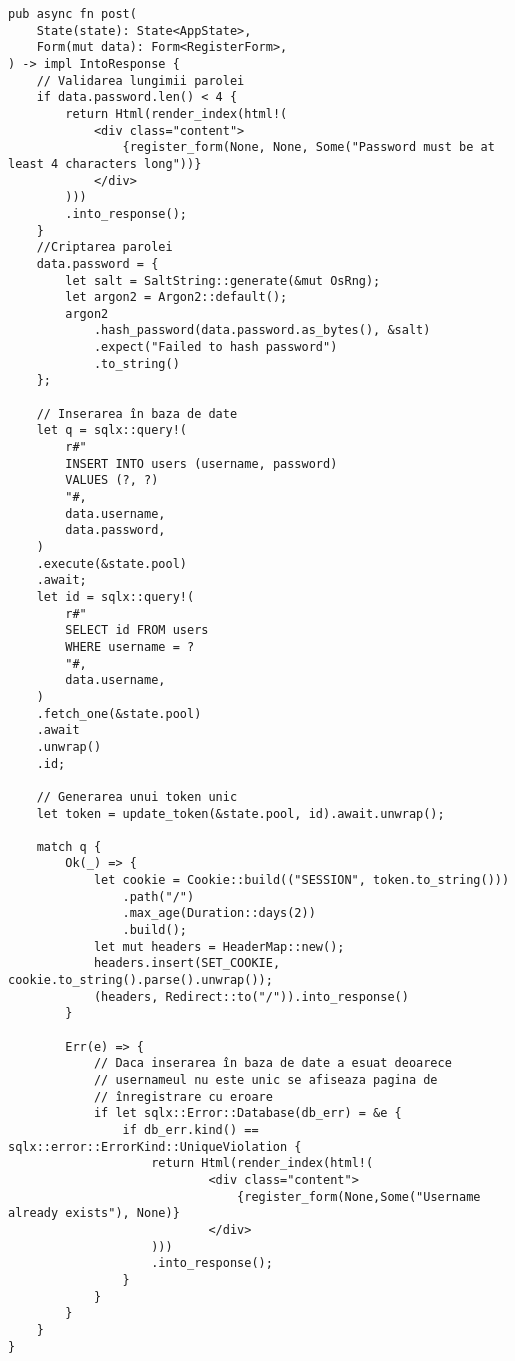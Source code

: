 \vspace{1cm}
\begin{lstlisting}[language=RustHtml]
pub async fn post(
    State(state): State<AppState>,
    Form(mut data): Form<RegisterForm>,
) -> impl IntoResponse {
    // Validarea lungimii parolei
    if data.password.len() < 4 {
        return Html(render_index(html!(
			<div class="content">
                {register_form(None, None, Some("Password must be at least 4 characters long"))}
            </div>
        )))
        .into_response();
    }
    //Criptarea parolei
    data.password = {
        let salt = SaltString::generate(&mut OsRng);
        let argon2 = Argon2::default();
        argon2
            .hash_password(data.password.as_bytes(), &salt)
            .expect("Failed to hash password")
            .to_string()
    };

    // Inserarea în baza de date
    let q = sqlx::query!(
        r#"
        INSERT INTO users (username, password)
        VALUES (?, ?)
        "#,
        data.username,
        data.password,
    )
    .execute(&state.pool)
    .await;
    let id = sqlx::query!(
        r#"
        SELECT id FROM users
        WHERE username = ?
        "#,
        data.username,
    )
    .fetch_one(&state.pool)
    .await
    .unwrap()
    .id;

    // Generarea unui token unic
    let token = update_token(&state.pool, id).await.unwrap();

    match q {
        Ok(_) => {
            let cookie = Cookie::build(("SESSION", token.to_string()))
                .path("/")
                .max_age(Duration::days(2))
                .build();
            let mut headers = HeaderMap::new();
            headers.insert(SET_COOKIE, cookie.to_string().parse().unwrap());
            (headers, Redirect::to("/")).into_response()
        }

        Err(e) => {
            // Daca inserarea în baza de date a esuat deoarece
            // usernameul nu este unic se afiseaza pagina de 
            // înregistrare cu eroare
            if let sqlx::Error::Database(db_err) = &e {
                if db_err.kind() == sqlx::error::ErrorKind::UniqueViolation {
                    return Html(render_index(html!(
                            <div class="content">
                                {register_form(None,Some("Username already exists"), None)}
                            </div>
                    )))
                    .into_response();
                }
            }
        }
    }
}
\end{lstlisting}

